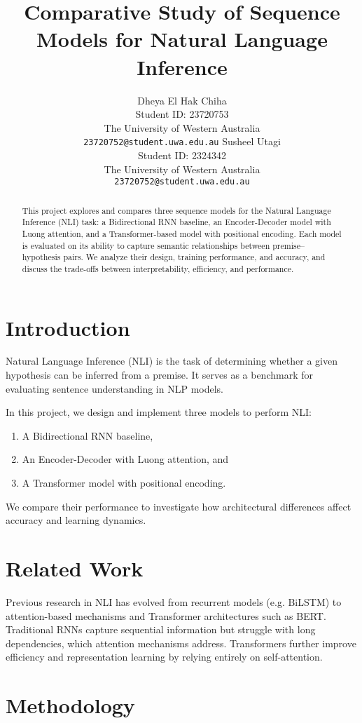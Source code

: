 \documentclass[11pt]{article}
\title{Comparative Study of Sequence Models for Natural Language Inference}
\author{
  Dheya El Hak Chiha \\
  Student ID: 23720753 \\
  The University of Western Australia \\
  \texttt{23720752@student.uwa.edu.au}
  \And
  Susheel Utagi \\
  Student ID: 2324342 \\
  The University of Western Australia \\
  \texttt{23720752@student.uwa.edu.au}
}
\begin{document}
\maketitle

\begin{abstract}
This project explores and compares three sequence models for the Natural Language Inference (NLI) task: a Bidirectional RNN baseline, an Encoder-Decoder model with Luong attention, and a Transformer-based model with positional encoding. Each model is evaluated on its ability to capture semantic relationships between premise–hypothesis pairs. We analyze their design, training performance, and accuracy, and discuss the trade-offs between interpretability, efficiency, and performance.
\end{abstract}

\section{Introduction}
Natural Language Inference (NLI) is the task of determining whether a given hypothesis can be inferred from a premise. It serves as a benchmark for evaluating sentence understanding in NLP models.

In this project, we design and implement three models to perform NLI:
\begin{enumerate}
    \item A Bidirectional RNN baseline,
    \item An Encoder-Decoder with Luong attention, and
    \item A Transformer model with positional encoding.
\end{enumerate}
We compare their performance to investigate how architectural differences affect accuracy and learning dynamics.

\section{Related Work}
Previous research in NLI has evolved from recurrent models (e.g. BiLSTM) to attention-based mechanisms and Transformer architectures such as BERT. Traditional RNNs capture sequential information but struggle with long dependencies, which attention mechanisms address. Transformers further improve efficiency and representation learning by relying entirely on self-attention.

\section{Methodology}
\end{document}
